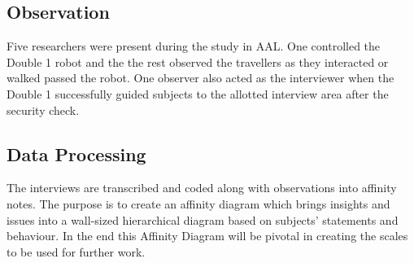  \subsection{Observation}
Five researchers were present during the study in AAL. One controlled the Double 1 robot and the the rest observed the travellers as they interacted or walked passed the robot. One observer also acted as the interviewer when the Double 1 successfully guided subjects to the allotted interview area after the security check. 


\subsection{Data Processing}
The interviews are transcribed and coded along with observations into affinity notes. The purpose is to create an affinity diagram \cite{Wendell2005} which brings insights and issues into a wall-sized hierarchical diagram based on subjects' statements and behaviour. In the end this Affinity Diagram will be pivotal in creating the scales to be used for further work.










